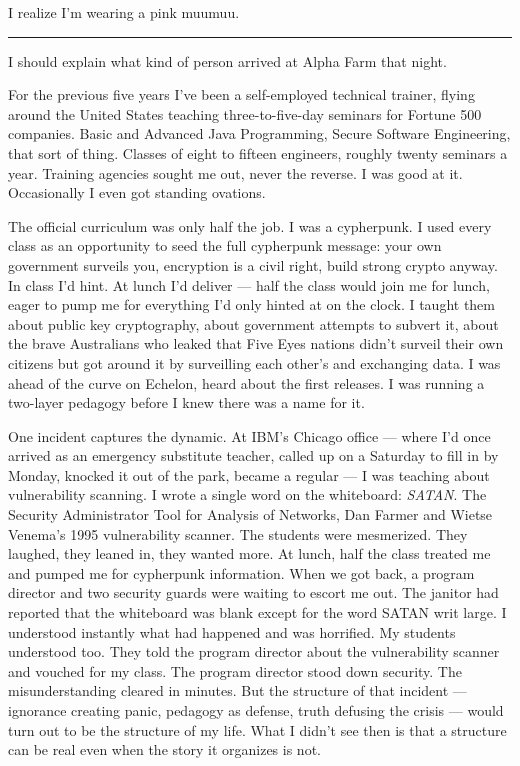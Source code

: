 I realize I'm wearing a pink muumuu.

\vspace{1cm}\noindent\rule{0.5\textwidth}{0.5pt}\vspace{0.5cm}

I should explain what kind of person arrived at Alpha Farm that night.

For the previous five years I've been a self-employed technical trainer, flying around the United States teaching three-to-five-day seminars for Fortune 500 companies. Basic and Advanced Java Programming, Secure Software Engineering, that sort of thing. Classes of eight to fifteen engineers, roughly twenty seminars a year. Training agencies sought me out, never the reverse. I was good at it. Occasionally I even got standing ovations.

The official curriculum was only half the job. I was a cypherpunk.  I used every class as an opportunity to seed the full cypherpunk message: your own government surveils you, encryption is a civil right,  build strong crypto anyway. In class I'd hint. At lunch I'd deliver --- half the class would join me for lunch, eager to pump me for everything I'd only hinted at on the clock. I taught them about public key cryptography, about government attempts to subvert it, about the brave Australians who leaked that Five Eyes nations didn't surveil their own citizens but got around it by surveilling each other's and exchanging data. I was ahead of the curve on Echelon, heard about the first releases. I was running a two-layer pedagogy before I knew there was a name for it.

One incident captures the dynamic. At IBM's Chicago office --- where I'd once arrived as an emergency substitute teacher, called up on a Saturday to fill in by Monday, knocked it out of the park, became a regular --- I was teaching about vulnerability scanning. I wrote a single word on the whiteboard: \textit{SATAN}. The Security Administrator Tool for Analysis of Networks, Dan Farmer and Wietse Venema's 1995 vulnerability scanner. The students were mesmerized. They laughed, they leaned in, they wanted more. At lunch, half the class treated me and pumped me for cypherpunk information. When we got back, a program director and two security guards were waiting to escort me out. The janitor had reported that the whiteboard was blank except for the word SATAN writ large. I understood instantly what had happened and was horrified. My students understood too. They told the program director about the vulnerability scanner and vouched for my class. The program director stood down security. The misunderstanding cleared in minutes. But the structure of that incident --- ignorance creating panic, pedagogy as defense, truth defusing the crisis --- would turn out to be the structure of my life. What I didn't see then is that a structure can be real even when the story it organizes is not.

